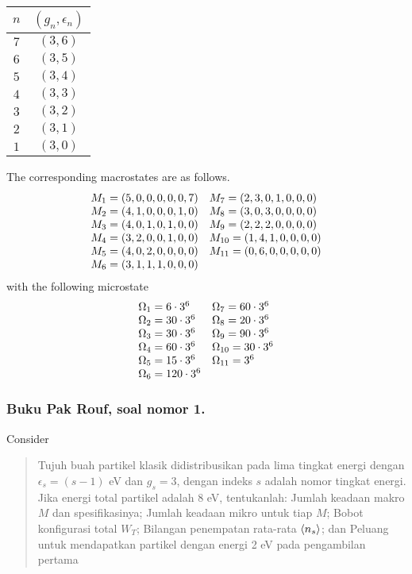 \documentclass[../../../Main.tex]{subfiles}
\begin{document}
\begin{table}[h]
    \centering
    \begin{tabular}{cc}
        \toprule
        $n$ & $(g_n,\epsilon_n)$\\ 
        \midrule
        $7$&$(3,6)$\\
        $6$&$(3,5)$\\
        $5$&$(3,4)$\\ 
        $4$&$(3,3)$\\
        $3$&$(3,2)$\\
        $2$&$(3,1)$\\
        $1$&$(3,0)$\\
        \bottomrule
    \end{tabular}
\end{table}
The corresponding macrostates are as follows.
\begin{equation*}
    \begin{array}{l l}
        M_1=(5,0,0,0,0,0,7)& M_7=(2,3,0,1,0,0,0)\\
        M_2=(4,1,0,0,0,1,0)& M_8=(3,0,3,0,0,0,0)\\
        M_3=(4,0,1,0,1,0,0)& M_9=(2,2,2,0,0,0,0)\\
        M_4=(3,2,0,0,1,0,0)& M_{10}=(1,4,1,0,0,0,0)\\
        M_5=(4,0,2,0,0,0,0)&M_{11}=(0,6,0,0,0,0,0)\\
        M_6=(3,1,1,1,0,0,0)&
    \end{array}
\end{equation*}
with the following microstate
\begin{equation*}
    \begin{array}{l l}
        \Omega_1=6\cdot3^6& \Omega_7=60\cdot3^6\\
        \Omega_2=30\cdot3^6& \Omega_8=20\cdot3^6\\
        \Omega_3=30\cdot3^6& \Omega_9=90\cdot3^6\\
        \Omega_4=60\cdot3^6& \Omega_{10}=30\cdot3^6\\
        \Omega_5=15\cdot3^6&\Omega_{11}=3^6\\
        \Omega_6=120\cdot3^6&
    \end{array}
\end{equation*}

\subsubsection*{Buku Pak Rouf, soal nomor 1.} Consider 
\begin{quotation}
    Tujuh buah partikel klasik didistribusikan pada lima tingkat energi dengan $\epsilon_s = (s-1) $ eV dan $g_s =3$, dengan indeks $s$ adalah nomor tingkat energi. Jika energi total partikel adalah 8 eV, tentukanlah: Jumlah keadaan makro $M$ dan spesifikasinya; Jumlah keadaan mikro untuk tiap $M$; Bobot konfigurasi total $W_T$; Bilangan penempatan rata-rata $\braket{n_s}$; dan Peluang untuk mendapatkan partikel dengan energi 2 eV pada pengambilan pertama
\end{quotation}
\end{document}
